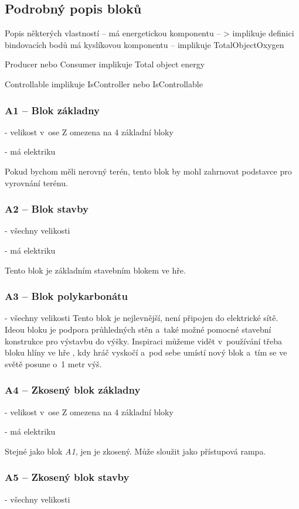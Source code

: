 \subsection{Podrobný popis bloků}

Popis některých vlastností -- má energetickou komponentu -- > implikuje definici bindovacích bodů
má kyslíkovou komponentu -- implikuje TotalObjectOxygen

Producer nebo Consumer implikuje Total object energy

Controllable implikuje IsController nebo IsControllable



\subsubsection{A1 -- Blok základny}
- velikost v~ose Z omezena na 4 základní bloky

- má elektriku

Pokud bychom měli nerovný terén, tento blok by mohl zahrnovat podstavce pro vyrovnání terénu.

\subsubsection{A2 -- Blok stavby}
- všechny velikosti

- má elektriku

Tento blok je základním stavebním blokem ve hře.

\subsubsection{A3 -- Blok polykarbonátu}
- všechny velikosti
Tento blok je nejlevnější, není připojen do elektrické sítě. Ideou bloku je podpora průhledných stěn a~také možné pomocné stavební konstrukce pro výstavbu do výšky. Inspiraci můžeme vidět v~používání třeba bloku hlíny ve hře \MC{}, kdy hráč vyskočí a~pod sebe umístí nový blok a~tím se ve světě posune o~1 metr výš.

\subsubsection{A4 -- Zkosený blok základny}
- velikost v~ose Z omezena na 4 základní bloky

- má elektriku

Stejné jako blok \textit{A1}, jen je zkosený. Může sloužit jako přístupová rampa.

\subsubsection{A5 -- Zkosený blok stavby}
- všechny velikosti

